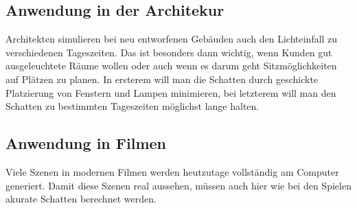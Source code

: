 \subsection*{Anwendung in der Architekur}

Architekten simulieren bei neu entworfenen Gebäuden auch den Lichteinfall zu verschiedenen Tageszeiten.
Das ist besonders dann wichtig, wenn Kunden gut ausgeleuchtete Räume wollen oder auch wenn es darum geht
Sitzmöglichkeiten auf Plätzen zu planen. In ersterem will man die Schatten durch geschickte Platzierung
von Fenstern und Lampen minimieren, bei letzterem will man den Schatten zu bestimmten Tageszeiten
möglichst lange halten.

\subsection*{Anwendung in Filmen}

Viele Szenen in modernen Filmen werden heutzutage vollständig am Computer generiert. Damit diese Szenen
real aussehen, müssen auch hier wie bei den Spielen akurate Schatten berechnet werden.
